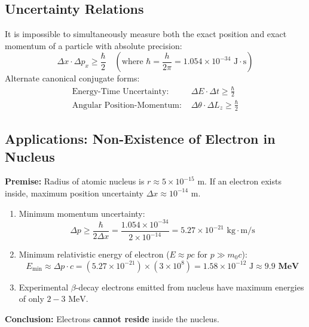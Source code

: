 \documentclass[12pt,a4paper]{article}
\begin{document}
\subsection{Uncertainty Relations}

\begin{tcolorbox}[formulabox, title={\textbf{Heisenberg Uncertainty Principle Relations}}]
It is impossible to simultaneously measure both the exact position and exact momentum of a particle with absolute precision:
\begin{equation}
\Delta x \cdot \Delta p_x \ge \frac{\hbar}{2} \quad \left(\text{where } \hbar = \frac{h}{2\pi} = 1.054 \times 10^{-34} \text{ J}\cdot\text{s}\right)
\end{equation}
Alternate canonical conjugate forms:
\begin{align}
\text{Energy-Time Uncertainty: } & \Delta E \cdot \Delta t \ge \frac{\hbar}{2} \\[3pt]
\text{Angular Position-Momentum: } & \Delta \theta \cdot \Delta L_z \ge \frac{\hbar}{2}
\end{align}
\end{tcolorbox}

\subsection{Applications: Non-Existence of Electron in Nucleus}

\begin{tcolorbox}[examplebox, title={\textbf{Proof: Non-Existence of Electron in Nucleus}}]
\textbf{Premise:} Radius of atomic nucleus is $r \approx 5 \times 10^{-15}\text{ m}$. If an electron exists inside, maximum position uncertainty $\Delta x \approx 10^{-14}\text{ m}$.

\begin{enumerate}[leftmargin=*, itemsep=2pt]
  \item Minimum momentum uncertainty:
   \begin{equation}
   \Delta p \ge \frac{\hbar}{2 \Delta x} = \frac{1.054 \times 10^{-34}}{2 \times 10^{-14}} = 5.27 \times 10^{-21}\text{ kg}\cdot\text{m/s}
   \end{equation}
  \item Minimum relativistic energy of electron ($E \approx p c$ for $p \gg m_0 c$):
   \begin{equation}
   E_{\min} \approx \Delta p \cdot c = (5.27 \times 10^{-21}) \times (3 \times 10^8) = 1.58 \times 10^{-12}\text{ J} \approx \mathbf{9.9\text{ MeV}}
   \end{equation}
  \item Experimental $\beta$-decay electrons emitted from nucleus have maximum energies of only $2 - 3\text{ MeV}$.
\end{enumerate}
\textbf{Conclusion:} Electrons \textbf{cannot reside} inside the nucleus.
\end{tcolorbox}
\end{document}
